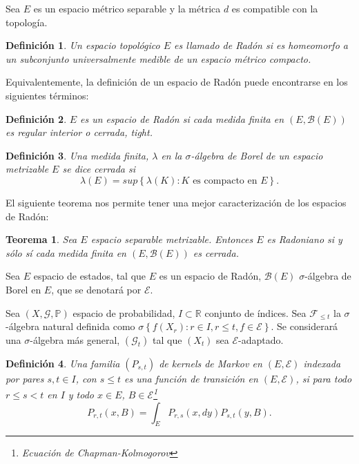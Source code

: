 \documentclass{article}
\newtheorem{Def}{Definición}
\newtheorem{Teo}{Teorema}
\newcommand{\rea}{\mathbb{R}}
\newcommand{\prob}{\mathbb{P}}
\newcommand{\ER}{\left(E,\mathcal{E}\right)}
\begin{document}
Sea $E$ es un espacio m\'etrico separable y la m\'etrica $d$ es
compatible con la topolog\'ia.


\begin{Def}
Un espacio topol\'ogico $E$ es llamado de {\em Rad\'on} si es
homeomorfo a un subconjunto universalmente medible de un espacio
m\'etrico compacto.
\end{Def}

Equivalentemente, la definici\'on de un espacio de Rad\'on puede
encontrarse en los siguientes t\'erminos:


\begin{Def}
$E$ es un espacio de Rad\'on si cada medida finita en
$\left(E,\mathcal{B}\left(E\right)\right)$ es regular interior o
cerrada, {\em tight}.
\end{Def}

\begin{Def}
Una medida finita, $\lambda$ en la $\sigma$-\'algebra de Borel de
un espacio metrizable $E$ se dice cerrada si
\begin{equation}\label{Eq.A2.3}
\lambda\left(E\right)=sup\left\{\lambda\left(K\right):K\textrm{ es
compacto en }E\right\}.
\end{equation}
\end{Def}

El siguiente teorema nos permite tener una mejor caracterizaci\'on
de los espacios de Rad\'on:
\begin{Teo}\label{Tma.A2.2}
Sea $E$ espacio separable metrizable. Entonces $E$ es Radoniano si
y s\'olo s\'i cada medida finita en
$\left(E,\mathcal{B}\left(E\right)\right)$ es cerrada.
\end{Teo}

Sea $E$ espacio de estados, tal que $E$ es un espacio de Rad\'on,
$\mathcal{B}\left(E\right)$ $\sigma$-\'algebra de Borel en $E$,
que se denotar\'a por $\mathcal{E}$.

Sea $\left(X,\mathcal{G},\prob\right)$ espacio de probabilidad,
$I\subset\rea$ conjunto de \'indices. Sea $\mathcal{F}_{\leq t}$
la $\sigma$-\'algebra natural definida como
$\sigma\left\{f\left(X_{r}\right):r\in I, r\leq
t,f\in\mathcal{E}\right\}$. Se considerar\'a una
$\sigma$-\'algebra m\'as general, $ \left(\mathcal{G}_{t}\right)$
tal que $\left(X_{t}\right)$ sea $\mathcal{E}$-adaptado.

\begin{Def}
Una familia $\left(P_{s,t}\right)$ de kernels de Markov en
$\left(E,\mathcal{E}\right)$ indexada por pares $s,t\in I$, con
$s\leq t$ es una funci\'on de transici\'on en $\ER$, si  para todo
$r\leq s< t$ en $I$ y todo $x\in E$,
$B\in\mathcal{E}$\footnote{Ecuaci\'on de Chapman-Kolmogorov}
\begin{equation}\label{Eq.Kernels}
P_{r,t}\left(x,B\right)=\int_{E}P_{r,s}\left(x,dy\right)P_{s,t}\left(y,B\right).
\end{equation}
\end{Def}
\end{document}
